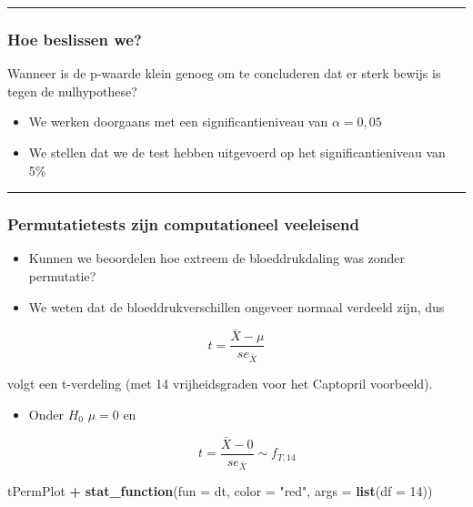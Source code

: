 \documentclass[
  12pt,dutch,coursenotes]{book}
\newenvironment{Shaded}{\begin{snugshade}}{\end{snugshade}}
\newcommand{\DataTypeTok}[1]{\textcolor[rgb]{0.13,0.29,0.53}{#1}}
\newcommand{\DecValTok}[1]{\textcolor[rgb]{0.00,0.00,0.81}{#1}}
\newcommand{\KeywordTok}[1]{\textcolor[rgb]{0.13,0.29,0.53}{\textbf{#1}}}
\newcommand{\NormalTok}[1]{#1}
\newcommand{\OperatorTok}[1]{\textcolor[rgb]{0.81,0.36,0.00}{\textbf{#1}}}
\newcommand{\StringTok}[1]{\textcolor[rgb]{0.31,0.60,0.02}{#1}}
\theoremstyle{definition}
\theoremstyle{definition}
\theoremstyle{definition}
\theoremstyle{remark}
\begin{document}
\begin{center}\rule{0.5\linewidth}{0.5pt}\end{center}

\hypertarget{hoe-beslissen-we}{%
\subsubsection{Hoe beslissen we?}\label{hoe-beslissen-we}}

Wanneer is de p-waarde klein genoeg om te concluderen dat er sterk bewijs is tegen de nulhypothese?

\begin{itemize}
\item
  We werken doorgaans met een significantieniveau van \(\alpha = 0,05\)
\item
  We stellen dat we de test hebben uitgevoerd op het significantieniveau van 5\%
\end{itemize}

\begin{center}\rule{0.5\linewidth}{0.5pt}\end{center}

\hypertarget{permutatietests-zijn-computationeel-veeleisend}{%
\subsubsection{Permutatietests zijn computationeel veeleisend}\label{permutatietests-zijn-computationeel-veeleisend}}

\begin{itemize}
\item
  Kunnen we beoordelen hoe extreem de bloeddrukdaling was zonder permutatie?
\item
  We weten dat de bloeddrukverschillen ongeveer normaal verdeeld zijn, dus
\end{itemize}

\[t=\frac{\bar X - \mu}{se_{\bar X}}\]

volgt een t-verdeling (met 14 vrijheidsgraden voor het Captopril voorbeeld).

\begin{itemize}
\item
  Onder \(H_0\) \(\mu=0\) en

  \[t=\frac{\bar X-0}{se_{\bar X}}\sim f_{T,14}\]
\end{itemize}

\begin{Shaded}
\begin{Highlighting}[]
\NormalTok{tPermPlot }\OperatorTok{+}\StringTok{ }\KeywordTok{stat\_function}\NormalTok{(}\DataTypeTok{fun =}\NormalTok{ dt, }\DataTypeTok{color =} \StringTok{"red"}\NormalTok{, }
    \DataTypeTok{args =} \KeywordTok{list}\NormalTok{(}\DataTypeTok{df =} \DecValTok{14}\NormalTok{))}
\end{Highlighting}
\end{Shaded}
\end{document}
